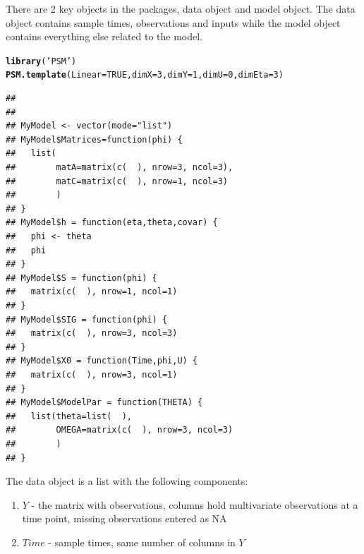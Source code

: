 \documentclass[a4paper,11pt]{article}\usepackage[]{graphicx}\usepackage[]{color}
\makeatletter
\newcommand{\hlnum}[1]{\textcolor[rgb]{0.686,0.059,0.569}{#1}}%
\newcommand{\hlstr}[1]{\textcolor[rgb]{0.192,0.494,0.8}{#1}}%
\newcommand{\hlstd}[1]{\textcolor[rgb]{0.345,0.345,0.345}{#1}}%
\newcommand{\hlkwc}[1]{\textcolor[rgb]{0.333,0.667,0.333}{#1}}%
\newcommand{\hlkwd}[1]{\textcolor[rgb]{0.737,0.353,0.396}{\textbf{#1}}}%
\newenvironment{kframe}{%
 \def\at@end@of@kframe{}%
 \ifinner\ifhmode%
  \def\at@end@of@kframe{\end{minipage}}%
  \begin{minipage}{\columnwidth}%
 \fi\fi%
 \def\FrameCommand##1{\hskip\@totalleftmargin \hskip-\fboxsep
 \colorbox{shadecolor}{##1}\hskip-\fboxsep
     \hskip-\linewidth \hskip-\@totalleftmargin \hskip\columnwidth}%
 \MakeFramed {\advance\hsize-\width
   \@totalleftmargin\z@ \linewidth\hsize
   \@setminipage}}%
 {\par\unskip\endMakeFramed%
 \at@end@of@kframe}
\newenvironment{knitrout}{}{} %
\makeatother
\begin{document}
There are 2 key objects in the packages, data object and model object. The data object contains sample times, observations and inputs while the model object contains everything else related to the model.

\begin{knitrout}
\color{fgcolor}\begin{kframe}
\begin{alltt}
\hlkwd{library}\hlstd{(}\hlstr{'PSM'}\hlstd{)}
\hlkwd{PSM.template}\hlstd{(}\hlkwc{Linear}\hlstd{=}\hlnum{TRUE}\hlstd{,}\hlkwc{dimX}\hlstd{=}\hlnum{3}\hlstd{,}\hlkwc{dimY}\hlstd{=}\hlnum{1}\hlstd{,}\hlkwc{dimU}\hlstd{=}\hlnum{0}\hlstd{,}\hlkwc{dimEta}\hlstd{=}\hlnum{3}\hlstd{)}
\end{alltt}
\begin{verbatim}
## 
## 
## MyModel <- vector(mode="list")
## MyModel$Matrices=function(phi) {
##   list(
##        matA=matrix(c(  ), nrow=3, ncol=3),
##        matC=matrix(c(  ), nrow=1, ncol=3)
##        )
## }
## MyModel$h = function(eta,theta,covar) {
##   phi <- theta
##   phi
## }
## MyModel$S = function(phi) {
##   matrix(c(  ), nrow=1, ncol=1)
## }
## MyModel$SIG = function(phi) {
##   matrix(c(  ), nrow=3, ncol=3)
## }
## MyModel$X0 = function(Time,phi,U) {
##   matrix(c(  ), nrow=3, ncol=1)
## }
## MyModel$ModelPar = function(THETA) {
##   list(theta=list(  ),
##        OMEGA=matrix(c(  ), nrow=3, ncol=3)
##        )
## }
\end{verbatim}
\end{kframe}
\end{knitrout}

The data object is a list with the following components:
\begin{enumerate}
\item $Y$ - the matrix with observations, columns hold multivariate observations at a time point, missing observations entered as NA
\item $Time$ - sample times, same number of columns in $Y$
\end{enumerate}
\end{document}
